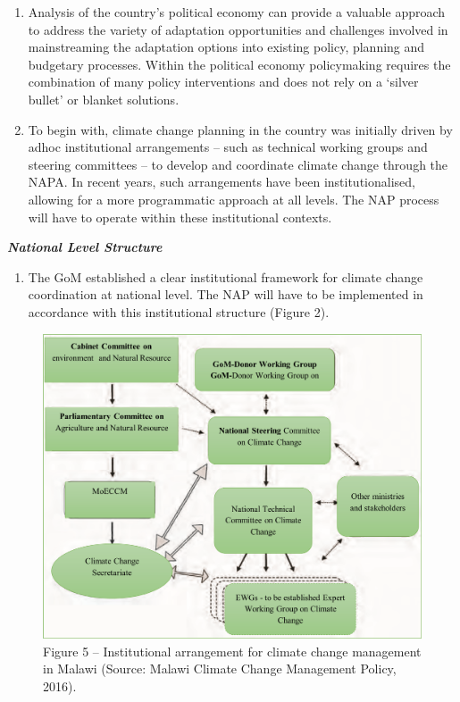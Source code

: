 \documentclass[
]{book}
\providecommand{\tightlist}{%
  \setlength{\itemsep}{0pt}\setlength{\parskip}{0pt}}
\begin{document}
\begin{enumerate}
\def\labelenumi{\arabic{enumi}.}
\setcounter{enumi}{22}
\item
  Analysis of the country's political economy can provide a valuable approach to address the variety of adaptation opportunities and challenges involved in mainstreaming the adaptation options into existing policy, planning and budgetary processes. Within the political economy policymaking requires the combination of many policy interventions and does not rely on a `silver bullet' or blanket solutions.
\item
  To begin with, climate change planning in the country was initially driven by adhoc institutional arrangements -- such as technical working groups and steering committees -- to develop and coordinate climate change through the NAPA. In recent years, such arrangements have been institutionalised, allowing for a more programmatic approach at all levels. The NAP process will have to operate within these institutional contexts.
\end{enumerate}

\textbf{\emph{National Level Structure}}

\begin{enumerate}
\def\labelenumi{\arabic{enumi}.}
\setcounter{enumi}{24}
\tightlist
\item
  The GoM established a clear institutional framework for climate change coordination at national level. The NAP will have to be implemented in accordance with this institutional structure (Figure 2).
\end{enumerate}

\begin{figure}
\centering
\includegraphics{images/national_structure.png}
\caption{Figure 5 -- Institutional arrangement for climate change management in Malawi (Source: Malawi Climate Change Management Policy, 2016).}
\end{figure}
\end{document}
